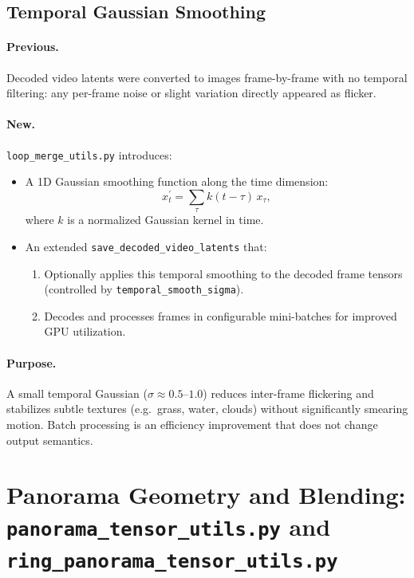 \documentclass[11pt,a4paper]{article}
\newcommand{\file}[1]{\texttt{#1}}
\newcommand{\fn}[1]{\texttt{#1}}
\begin{document}
\subsection{Temporal Gaussian Smoothing}

\paragraph{Previous.}
Decoded video latents were converted to images frame-by-frame with no temporal filtering:
any per-frame noise or slight variation directly appeared as flicker.

\paragraph{New.}
\file{loop\_merge\_utils.py} introduces:
\begin{itemize}
    \item A 1D Gaussian smoothing function along the time dimension:
    \[
        x^\prime_t = \sum_{\tau} k(t-\tau)\,x_\tau,
    \]
    where \(k\) is a normalized Gaussian kernel in time.
    \item An extended \fn{save\_decoded\_video\_latents} that:
    \begin{enumerate}
        \item Optionally applies this temporal smoothing to the decoded frame tensors (controlled by \fn{temporal\_smooth\_sigma}).
        \item Decodes and processes frames in configurable mini-batches for improved GPU utilization.
    \end{enumerate}
\end{itemize}

\paragraph{Purpose.}
A small temporal Gaussian (\(\sigma\approx 0.5\)–\(1.0\)) reduces inter-frame flickering and stabilizes subtle textures (e.g.\ grass, water, clouds) without significantly smearing motion.
Batch processing is an efficiency improvement that does not change output semantics.

\section{Panorama Geometry and Blending: \file{panorama\_tensor\_utils.py} and \file{ring\_panorama\_tensor\_utils.py}}
\end{document}
